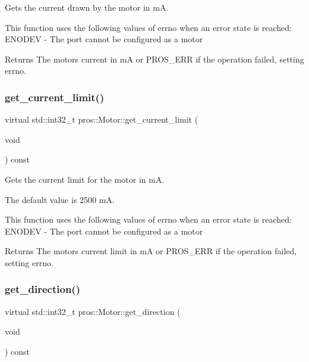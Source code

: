 Gets the current drawn by the motor in mA. 

This function uses the following values of errno when an error state is reached\+: E\+N\+O\+D\+EV -\/ The port cannot be configured as a motor

\begin{DoxyReturn}{Returns}
The motor\textquotesingle{}s current in mA or P\+R\+O\+S\+\_\+\+E\+RR if the operation failed, setting errno. 
\end{DoxyReturn}
\mbox{\label{classpros_1_1Motor_ad2eafcdf16ed480ddcbb80a45b19c01a}} 
\subsubsection{\texorpdfstring{get\+\_\+current\+\_\+limit()}{get\_current\_limit()}}
{\footnotesize\ttfamily virtual std\+::int32\+\_\+t pros\+::\+Motor\+::get\+\_\+current\+\_\+limit (\begin{DoxyParamCaption}\item[{void}]{ }\end{DoxyParamCaption}) const\hspace{0.3cm}{\ttfamily [virtual]}}



Gets the current limit for the motor in mA. 

The default value is 2500 mA.

This function uses the following values of errno when an error state is reached\+: E\+N\+O\+D\+EV -\/ The port cannot be configured as a motor

\begin{DoxyReturn}{Returns}
The motor\textquotesingle{}s current limit in mA or P\+R\+O\+S\+\_\+\+E\+RR if the operation failed, setting errno. 
\end{DoxyReturn}
\mbox{\label{classpros_1_1Motor_acea42a96da651f72f138ea268c76217f}} 
\subsubsection{\texorpdfstring{get\+\_\+direction()}{get\_direction()}}
{\footnotesize\ttfamily virtual std\+::int32\+\_\+t pros\+::\+Motor\+::get\+\_\+direction (\begin{DoxyParamCaption}\item[{void}]{ }\end{DoxyParamCaption}) const\hspace{0.3cm}{\ttfamily [virtual]}}



